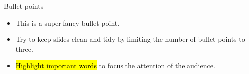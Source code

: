 \begin{frame}[c]{Bullet points}
%
\begin{itemize}
	\item This is a super fancy bullet point.
	\item Try to keep slides clean and tidy by limiting the number of bullet points to three.
	\item \hl{Highlight important words} to focus the attention of the audience.
\end{itemize}
%
\end{frame}
